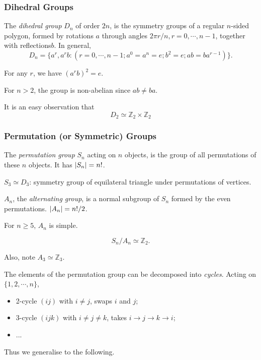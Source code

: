 \documentclass[a4paper,11pt]{article}
\begin{document}
	\subsubsection{Dihedral Groups}

	\begin{defi}
		The \emph{dihedral group} $D_n$ of order $2n$, is the symmetry groups of a regular $n$-sided polygon, formed by rotations $a$ through angles $2\pi r / n, r = 0, \cdots ,n-1$, together with reflections$b$. In general,
		\[
			D_n = \{a^r, a^rb : (r = 0, \cdots, n-1; a^0 = a^n =e; b^2 = e; ab = ba^{r-1})\}.
		\]
	\end{defi}
	
	For any $r$, we have $(a^r b)^2 = e$.

	For $n>2$, the group is non-abelian since $ab \neq ba $. 

	It is an easy observation that
	\[
		D_2 \simeq \mathbb{Z}_2 \times \mathbb{Z}_2
	\]
	
	\subsubsection{Permutation (or Symmetric) Groups}
	\begin{defi}
		The \emph{permutation group} $S_n$ acting on $n$ objects, is the group of all permutations of these $n$ objects. It has $\abs{S_n} = n!$.
	\end{defi}

	\begin{ex}
		$S_3 \simeq D_3$: symmetry group of equilateral triangle under permutations of vertices.
	\end{ex}

	\begin{defi}
		$A_n$, the \emph{alternating group}, is a normal subgroup of $S_n$ formed by the even permutations. $\abs{A_n} = n! / 2$.
	\end{defi}

	\begin{cor}
		For $n \geq 5$, $A_n$ is simple.
	\end{cor}

	\begin{prop}
		\[
			S_n / A_n \simeq \mathbb{Z}_2.
		\]
	\end{prop}

	Also, note $A_3 \simeq \mathbb{Z}_3$.

	The elements of the permutation group can be decomposed into \emph{cycles}. Acting on $\{1,2,\cdots, n\}$, 
	\begin{itemize}
		\item 2-cycle $(ij)$ with $i\neq j$, swaps $i$ and $j$;
		\item 3-cycle $(ijk)$ with $i\neq j \neq k$, takes $i \to j \to k \to i$;
		\item ... 
	\end{itemize}
	Thus we generalise to the following.
\end{document}
